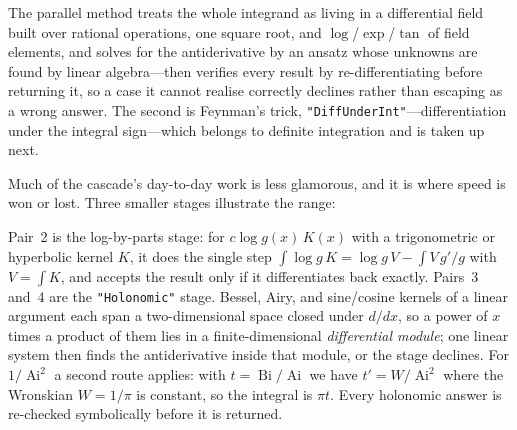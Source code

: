 The parallel method treats the whole integrand as living in a differential field
built over rational operations, one square root, and \(\log\)/\(\exp\)/\(\tan\) of
field elements, and solves for the antiderivative by an ansatz whose unknowns are
found by linear algebra---then verifies every result by re-differentiating before
returning it, so a case it cannot realise correctly declines rather than escaping
as a wrong answer. The second is Feynman's trick,
\texttt{"DiffUnderInt"}---differentiation under the integral sign---which belongs
to definite integration and is taken up next.

Much of the cascade's day-to-day work is less glamorous, and it is where speed is
won or lost. Three smaller stages illustrate the range:

\begin{codepairs}
\end{codepairs}

Pair~2 is the log-by-parts stage: for \(c\log g(x)\,K(x)\) with a trigonometric
or hyperbolic kernel \(K\), it does the single step \(\int\log g\,K=\log g\,V-\int
V\,g'/g\) with \(V=\int K\), and accepts the result only if it differentiates back
exactly. Pairs~3 and~4 are
the \texttt{"Holonomic"} stage. Bessel, Airy, and
sine/cosine kernels of a linear argument each span a two-dimensional space closed
under \(d/dx\), so a power of \(x\) times a product of them lies in a
finite-dimensional \emph{differential module}; one linear system then finds the
antiderivative inside that module, or the stage declines. For
\(1/\operatorname{Ai}^2\) a second route applies: with \(t=\operatorname{Bi}/\operatorname{Ai}\)
we have \(t' = W/\operatorname{Ai}^2\) where the Wronskian \(W=1/\pi\) is constant, so the
integral is \(\pi t\). Every holonomic answer is re-checked symbolically before it
is returned.

